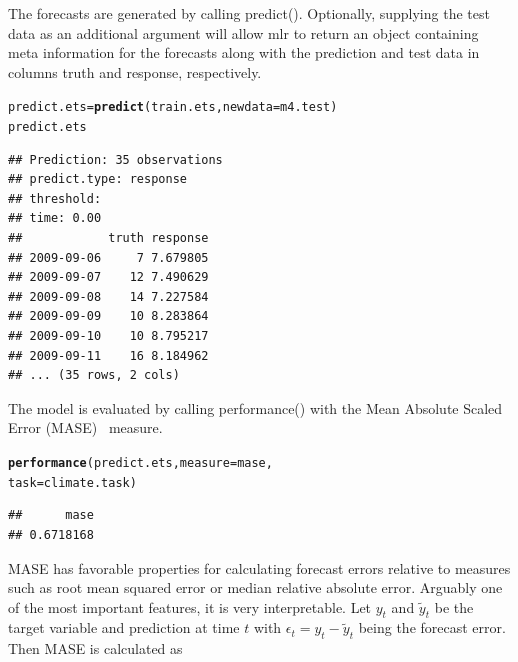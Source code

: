 \documentclass[12pt]{article}\usepackage[]{graphicx}\usepackage[]{color}
\makeatletter
\newcommand{\hlstd}[1]{\textcolor[rgb]{0.345,0.345,0.345}{#1}}%
\newcommand{\hlkwb}[1]{\textcolor[rgb]{0.69,0.353,0.396}{#1}}%
\newcommand{\hlkwc}[1]{\textcolor[rgb]{0.333,0.667,0.333}{#1}}%
\newcommand{\hlkwd}[1]{\textcolor[rgb]{0.737,0.353,0.396}{\textbf{#1}}}%
\newenvironment{kframe}{%
 \def\at@end@of@kframe{}%
 \ifinner\ifhmode%
  \def\at@end@of@kframe{\end{minipage}}%
  \begin{minipage}{\columnwidth}%
 \fi\fi%
 \def\FrameCommand##1{\hskip\@totalleftmargin \hskip-\fboxsep
 \colorbox{shadecolor}{##1}\hskip-\fboxsep
     \hskip-\linewidth \hskip-\@totalleftmargin \hskip\columnwidth}%
 \MakeFramed {\advance\hsize-\width
   \@totalleftmargin\z@ \linewidth\hsize
   \@setminipage}}%
 {\par\unskip\endMakeFramed%
 \at@end@of@kframe}
\newenvironment{knitrout}{}{} %
\theoremstyle{definition}
\newcommand\code{\@codex}
\def\@codex#1{{\normalfont\ttfamily\hyphenchar\font=-1 #1}}
\newcommand{\pkg}[1]{{\fontseries{b}\selectfont #1}}
\makeatother
\begin{document}
The forecasts are generated by calling \code{predict()}. Optionally, supplying the test data as an additional argument will allow \pkg{mlr} to return an object containing meta information for the forecasts along with the prediction and test data in columns \code{truth} and \code{response}, respectively.

\singlespacing
\begin{knitrout}
\color{fgcolor}\begin{kframe}
\begin{alltt}
\hlstd{predict.ets} \hlkwb{=} \hlkwd{predict}\hlstd{(train.ets,} \hlkwc{newdata} \hlstd{= m4.test)}
\hlstd{predict.ets}
\end{alltt}
\begin{verbatim}
## Prediction: 35 observations
## predict.type: response
## threshold: 
## time: 0.00
##            truth response
## 2009-09-06     7 7.679805
## 2009-09-07    12 7.490629
## 2009-09-08    14 7.227584
## 2009-09-09    10 8.283864
## 2009-09-10    10 8.795217
## 2009-09-11    16 8.184962
## ... (35 rows, 2 cols)
\end{verbatim}
\end{kframe}
\end{knitrout}
\doublespacing

The model is evaluated by calling \code{performance()} with the Mean Absolute Scaled Error (MASE)~\cite{Hyndman2006} measure.

\singlespacing
\begin{knitrout}
\color{fgcolor}\begin{kframe}
\begin{alltt}
\hlkwd{performance}\hlstd{(predict.ets,} \hlkwc{measure} \hlstd{= mase,}
            \hlkwc{task} \hlstd{= climate.task)}
\end{alltt}
\begin{verbatim}
##      mase 
## 0.6718168
\end{verbatim}
\end{kframe}
\end{knitrout}
\doublespacing
MASE has favorable properties for calculating forecast errors relative to measures such as root mean squared error or median relative absolute error. Arguably one of the most important features, it is very interpretable. Let $y_t$ and $\tilde{y}_t$ be the target variable and prediction at time $t$ with $\epsilon_t = y_t - \tilde{y}_t$ being the forecast error. Then MASE is calculated as
\end{document}
